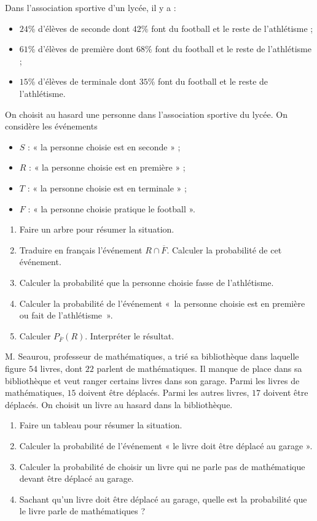 \documentclass[11pt]{article}
\begin{document}
\begin{exo}
  Dans l'association sportive d'un lycée, il y a :
  \begin{itemize}
    \item $24$\% d'élèves de seconde dont $42$\% font du football et le reste de
      l'athlétisme ;
    \item $61$\% d'élèves de première dont $68$\% font du football et le reste de
      l'athlétisme ;
    \item $15$\% d'élèves de terminale dont $35$\% font du football et le reste de
      l'athlétisme.
  \end{itemize}
  On choisit au hasard une personne dans l'association sportive du lycée.
  On considère les événements
  \begin{itemize}
    \item $S$ : « la personne choisie est en seconde » ;
    \item $R$ : « la personne choisie est en première » ;
    \item $T$ : « la personne choisie est en terminale » ;
    \item $F$ : « la personne choisie pratique le football ».
  \end{itemize}
  \begin{enumerate}
    \item Faire un arbre pour résumer la situation.
    \item Traduire en français l'événement $R\cap \overline F$. Calculer la
      probabilité de cet événement.
    \item Calculer la probabilité que la personne choisie fasse de l'athlétisme.
    \item Calculer la probabilité de l'événement «~la personne choisie est en
      première ou fait de l'athlétisme~».
    \item Calculer $P_{\overline F}(R)$. Interpréter le résultat.
  \end{enumerate}
\end{exo}

\begin{exo}
  M. Seaurou, professeur de mathématiques, a trié sa bibliothèque dans laquelle
  figure $54$ livres, dont $22$ parlent de mathématiques. Il manque de place
  dans sa bibliothèque et veut ranger certains livres dans son garage. Parmi les
  livres de mathématiques, $15$ doivent être déplacés. Parmi les autres livres,
  $17$ doivent être déplacés. On choisit un livre au hasard dans la
  bibliothèque.
  \begin{enumerate}
    \item Faire un tableau pour résumer la situation.
    \item Calculer la probabilité de l'événement « le livre doit être déplacé au
      garage ».
    \item Calculer la probabilité de choisir un livre qui ne parle pas de
      mathématique devant être déplacé au garage.
    \item Sachant qu'un livre doit être déplacé au garage, quelle est la
      probabilité que le livre parle de mathématiques ?
  \end{enumerate}
\end{exo}
\end{document}

